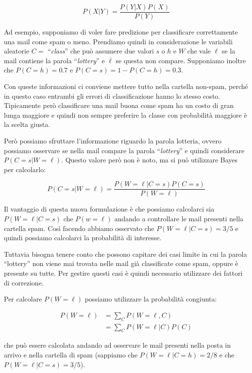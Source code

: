 $$
P(X|Y) = \frac{P(Y|X)P(X)}{P(Y)}
$$

\noindent Ad esempio, supponiamo di voler fare predizione per classificare correttamente una mail come spam o meno. Prendiamo quindi in considerazione le variabili aleatorie $C = $ ``\textit{class}'' che può assumere due valori $s$ o $h$ e $W$ che vale $\ell$ se la mail contiene la parola ``\textit{lottery}'' e $\overline{\ell}$ se questa non compare.
Supponiamo inoltre che $P(C = h) = 0.7$ e $P(C = s) = 1 - P(C = h) = 0.3$. 

Con queste informazioni ci conviene mettere tutto nella cartella non-spam, perché in questo caso entrambi gli errori di classificazione hanno lo stesso costo. Tipicamente però classificare una mail buona come spam ha un costo di gran lunga maggiore e quindi non sempre preferire la classe con probabilità maggiore è la scelta giusta.

Però possiamo sfruttare l'informazione riguardo la parola lotteria, ovvero possiamo osservare se nella mail compare la parola ``\textit{lottery}'' e quindi considerare $P(C = s | W = \ell)$. Questo valore però non è noto, ma si può utilizzare Bayes per calcolarlo:

$$
P(C = s | W = \ell) = \frac{P(W = \ell | C = s)P(C=s)}{P(W = \ell)}
$$

\noindent Il vantaggio di questa nuova formulazione è che possiamo calcolarci sia $P(W = \ell | C = s)$ che $P(w = \ell)$ andando a controllare le mail presenti nella cartella spam.
Così facendo abbiamo osservato che $P(W = \ell | C = s) = 3/5$ e quindi possiamo calcolarci la probabilità di interesse.

Tuttavia bisogna tenere conto che possono capitare dei casi limite in cui la parola ``lottery'' non viene mai trovata nelle mail già classificate come spam, oppure è presente su tutte. Per gestire questi casi è quindi necessario utilizzare dei fattori di correzione.

Per calcolare $P(W = \ell)$ possiamo utilizzare la probabilità congiunta:

\begin{align*}
	P(W = \ell)&= \sum\limits_{C} P(W = \ell, C) \\
			&= \sum\limits_{C} P(W = \ell | C)P(C)
\end{align*}

\noindent che può essere calcolata andando ad osservare le mail presenti nella posta in arrivo e nella cartella di spam (sappiamo che $P(W = \ell | C = h) = 2/8$ e che $P(W = \ell | C = s) = 3/5$).

